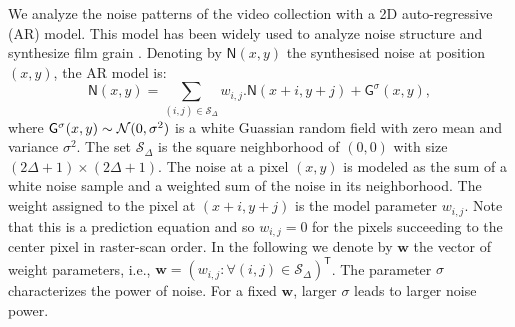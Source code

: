 \documentclass{sig-alternate}
\newcommand{\vect}[1]{\boldsymbol{#1}} %
\begin{document}
We analyze the noise patterns of the video collection with a 2D auto-regressive (AR) model. This model has been widely used to analyze noise structure and synthesize film grain \cite{DeStefano2006,ColRobWhi2004}. Denoting by $\mathsf{N}(x,y)$ the synthesised noise at position $(x,y)$, the AR model is:
\begin{equation}
\label{eq:ar_noise_model}
\mathsf{N}(x,y) = \sum\limits_{(i,j) \in \mathcal{S}_\Delta} {w_{i,j}.\mathsf{N}(x+i,y+j)}+\mathsf{G}^{\sigma}(x,y),
\end{equation}
where $\mathsf{G}^{\sigma}(x,y) \sim {\cal N}(0,\sigma^2)$ is
a white Guassian random field with zero mean and variance $\sigma^2$. The set $\mathcal{S}_\Delta$ is the square neighborhood of $(0,0)$ with size $(2\Delta + 1)\times(2\Delta + 1)$. The noise at a pixel $(x,y)$ is modeled as the sum of a white noise sample and a weighted sum of the noise in its neighborhood. The weight assigned to the pixel at $(x+i,y+j)$ is the model parameter $w_{i,j}$. Note that this is a prediction equation and so $w_{i,j} = 0$ for the pixels succeeding to the center pixel in raster-scan order. In the following we denote by $\vect{w}$ the vector of weight parameters, i.e., $\vect{w} = \left(w_{i,j}: \forall (i,j)\in\mathcal{S}_\Delta\right)^\mathsf{T}$. The parameter $\sigma$ characterizes the power of noise. For a fixed $\vect{w}$, larger $\sigma$ leads to larger noise power.
\end{document}
